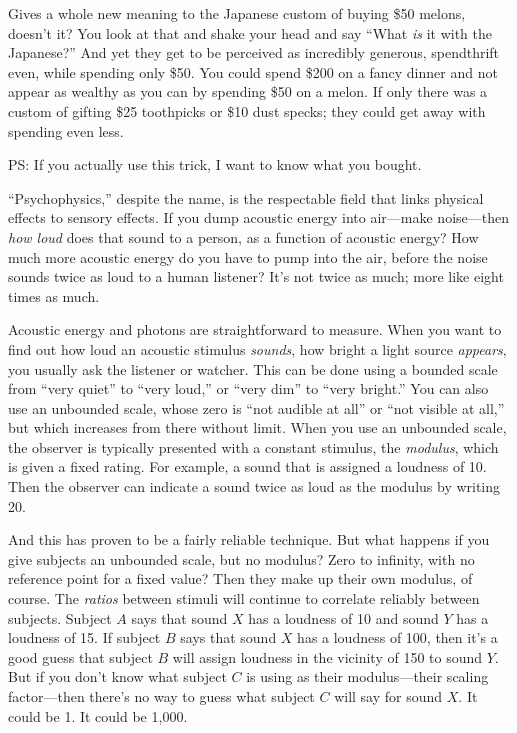 {
 Gives a whole new meaning to the Japanese custom of buying \$50
melons, doesn't it? You look at that and shake your
head and say ``What \textit{is} it with the
Japanese?'' And yet they get to be perceived as
incredibly generous, spendthrift even, while spending only \$50. You
could spend \$200 on a fancy dinner and not appear as wealthy as you
can by spending \$50 on a melon. If only there was a custom of gifting
\$25 toothpicks or \$10 dust specks; they could get away with spending
even less.}

{
 PS: If you actually use this trick, I want to know what you
bought.}

\myendsectiontext


\bigskip


{
 ``Psychophysics,'' despite the
name, is the respectable field that links physical effects to sensory
effects. If you dump acoustic energy into air---make noise---then
\textit{how loud} does that sound to a person, as a function of
acoustic energy? How much more acoustic energy do you have to pump into
the air, before the noise sounds twice as loud to a human listener?
It's not twice as much; more like eight times as much.
}

{
 Acoustic energy and photons are straightforward to measure. When
you want to find out how loud an acoustic stimulus \textit{sounds}, how
bright a light source \textit{appears}, you usually ask the listener or
watcher. This can be done using a bounded scale from
``very quiet'' to
``very loud,'' or
``very dim'' to
``very bright.'' You can also use an
unbounded scale, whose zero is ``not audible at
all'' or ``not visible at
all,'' but which increases from there without limit.
When you use an unbounded scale, the observer is typically presented
with a constant stimulus, the \textit{modulus}, which is given a fixed
rating. For example, a sound that is assigned a loudness of 10. Then
the observer can indicate a sound twice as loud as the modulus by
writing 20.}

{
 And this has proven to be a fairly reliable technique. But what
happens if you give subjects an unbounded scale, but no modulus? Zero
to infinity, with no reference point for a fixed value? Then they make
up their own modulus, of course. The \textit{ratios} between stimuli
will continue to correlate reliably between subjects. Subject $A$ says
that sound $X$ has a loudness of 10 and sound $Y$ has a loudness of 15. If
subject $B$ says that sound $X$ has a loudness of 100, then
it's a good guess that subject $B$ will assign loudness
in the vicinity of 150 to sound $Y$. But if you don't
know what subject $C$ is using as their modulus---their scaling
factor---then there's no way to guess what subject $C$
will say for sound $X$. It could be 1. It could be 1,000.}


